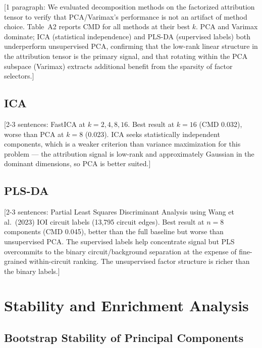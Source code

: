 \documentclass[11pt]{article}
\begin{document}
[1 paragraph: We evaluated decomposition methods on the factorized
attribution tensor to verify that PCA/Varimax's performance is not an
artifact of method choice. Table~A2 reports CMD for all methods at their
best $k$. PCA and Varimax dominate; ICA (statistical independence) and
PLS-DA (supervised labels) both underperform unsupervised PCA, confirming
that the low-rank linear structure in the attribution tensor is the
primary signal, and that rotating within the PCA subspace (Varimax)
extracts additional benefit from the sparsity of factor selectors.]

\subsection{ICA}

[2-3 sentences: FastICA at $k = 2, 4, 8, 16$. Best result at $k=16$
(CMD 0.032), worse than PCA at $k=8$ (0.023). ICA seeks statistically
independent components, which is a weaker criterion than variance
maximization for this problem --- the attribution signal is low-rank
and approximately Gaussian in the dominant dimensions, so PCA is
better suited.]

\subsection{PLS-DA}

[2-3 sentences: Partial Least Squares Discriminant Analysis using Wang et
al.\ (2023) IOI circuit labels (13{,}795 circuit edges). Best result at
$n=8$ components (CMD 0.045), better than the full baseline but worse
than unsupervised PCA. The supervised labels help concentrate signal but
PLS overcommits to the binary circuit/background separation at the expense
of fine-grained within-circuit ranking. The unsupervised factor structure
is richer than the binary labels.]



\section{Stability and Enrichment Analysis}
\label{app:stability_enrichment}

\subsection{Bootstrap Stability of Principal Components}
\end{document}
